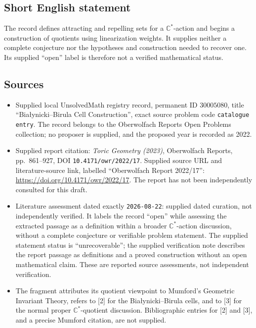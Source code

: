 \documentclass[11pt]{article}
\newcommand{\C}{\mathbb{C}}
\begin{document}
\subsection{Short English statement}
The record defines attracting and repelling sets for a \(\C^*\)-action and begins a construction of quotients using linearization weights. It supplies neither a complete conjecture nor the hypotheses and construction needed to recover one. Its supplied ``open'' label is therefore not a verified mathematical status.
\subsection{Sources}
\begin{itemize}
\item Supplied local UnsolvedMath registry record, permanent ID \(30005080\), title ``Bia\l{}ynicki--Birula Cell Construction'', exact source problem code \texttt{catalogue entry}. The record belongs to the Oberwolfach Reports Open Problems collection; no proposer is supplied, and the proposed year is recorded as 2022.
\item Supplied report citation: \emph{Toric Geometry (2023)}, Oberwolfach Reports, pp.\ 861--927, DOI \texttt{10.4171/owr/2022/17}. Supplied source URL and literature-source link, labelled ``Oberwolfach Report 2022/17'': \url{https://doi.org/10.4171/owr/2022/17}. The report has not been independently consulted for this draft.
\item Literature assessment dated exactly \texttt{2026-08-22}: supplied dated curation, not independently verified. It labels the record ``open'' while assessing the extracted passage as a definition within a broader \(\C^*\)-action discussion, without a complete conjecture or verifiable problem statement. The supplied statement status is ``unrecoverable''; the supplied verification note describes the report passage as definitions and a proved construction without an open mathematical claim. These are reported source assessments, not independent verification.
\item The fragment attributes its quotient viewpoint to Mumford's Geometric Invariant Theory, refers to [2] for the Bia\l{}ynicki--Birula cells, and to [3] for the normal proper \(\C^*\)-quotient discussion. Bibliographic entries for [2] and [3], and a precise Mumford citation, are not supplied.
\end{itemize}
\end{document}
